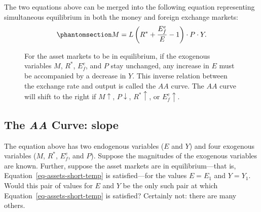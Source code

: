 \documentclass[
  letterpaper,
]{book}
\theoremstyle{plain}
\theoremstyle{remark}
\begin{document}
The two equations above can be merged into the following equation
representing simultaneous equilibrium in both the money and foreign
exchange markets:
\begin{equation}\phantomsection\label{eq-assets-short-temp}{
M=L\left(R^*+\frac{E^e_f}{E}-1\right)\cdot P\cdot Y.
}\end{equation}

\begin{figure}


\caption{\label{fig-AA}For the asset markets to be in equilibrium, if
the exogenous variables \(M\), \(R^*\), \(E_f^e\), and \(P\) stay
unchanged, any increase in \(E\) must be accompanied by a decrease in
\(Y\). This inverse relation between the exchange rate and output is
called the \(AA\) curve. The \(AA\) curve will shift to the right if
\(M\uparrow\), \(P\downarrow\), \(R^*\uparrow\), or \(E_f^e\uparrow\).}

\end{figure}%

\subsection{\texorpdfstring{The \emph{AA} Curve:
slope}{The AA Curve: slope}}\label{sec-AA}

The equation above has two endogenous variables (\(E\) and \(Y\)) and
four exogenous variables (\(M\), \(R^*\), \(E_f^e\), and \(P\)). Suppose
the magnitudes of the exogenous variables are known. Further, suppose
the asset markets are in equilibrium---that is,
Equation~\ref{eq-assets-short-temp} is satisfied---for the values
\(E=E_1\) and \(Y=Y_1\). Would this pair of values for \(E\) and \(Y\)
be the only such pair at which Equation~\ref{eq-assets-short-temp} is
satisfied? Certainly not: there are many others.
\end{document}
